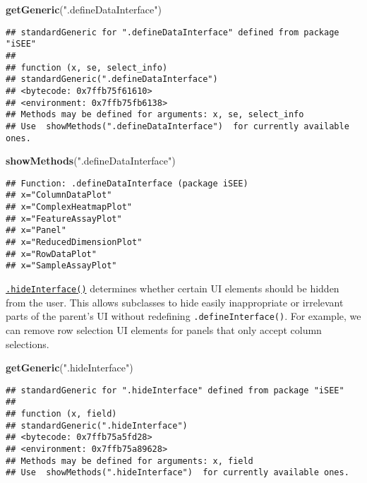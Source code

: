 \documentclass[
]{book}
\newenvironment{Shaded}{\begin{snugshade}}{\end{snugshade}}
\newcommand{\KeywordTok}[1]{\textcolor[rgb]{0.13,0.29,0.53}{\textbf{#1}}}
\newcommand{\NormalTok}[1]{#1}
\newcommand{\StringTok}[1]{\textcolor[rgb]{0.31,0.60,0.02}{#1}}
\begin{document}
\begin{Shaded}
\begin{Highlighting}[]
\KeywordTok{getGeneric}\NormalTok{(}\StringTok{".defineDataInterface"}\NormalTok{)}
\end{Highlighting}
\end{Shaded}

\begin{verbatim}
## standardGeneric for ".defineDataInterface" defined from package "iSEE"
## 
## function (x, se, select_info) 
## standardGeneric(".defineDataInterface")
## <bytecode: 0x7ffb75f61610>
## <environment: 0x7ffb75fb6138>
## Methods may be defined for arguments: x, se, select_info
## Use  showMethods(".defineDataInterface")  for currently available ones.
\end{verbatim}

\begin{Shaded}
\begin{Highlighting}[]
\KeywordTok{showMethods}\NormalTok{(}\StringTok{".defineDataInterface"}\NormalTok{)}
\end{Highlighting}
\end{Shaded}

\begin{verbatim}
## Function: .defineDataInterface (package iSEE)
## x="ColumnDataPlot"
## x="ComplexHeatmapPlot"
## x="FeatureAssayPlot"
## x="Panel"
## x="ReducedDimensionPlot"
## x="RowDataPlot"
## x="SampleAssayPlot"
\end{verbatim}

\href{https://isee.github.io/iSEE/reference/interface-generics.html}{\texttt{.hideInterface()}} determines whether certain UI elements should be hidden from the user.
This allows subclasses to hide easily inappropriate or irrelevant parts of the parent's UI without redefining \texttt{.defineInterface()}.
For example, we can remove row selection UI elements for panels that only accept column selections.

\begin{Shaded}
\begin{Highlighting}[]
\KeywordTok{getGeneric}\NormalTok{(}\StringTok{".hideInterface"}\NormalTok{)}
\end{Highlighting}
\end{Shaded}

\begin{verbatim}
## standardGeneric for ".hideInterface" defined from package "iSEE"
## 
## function (x, field) 
## standardGeneric(".hideInterface")
## <bytecode: 0x7ffb75a5fd28>
## <environment: 0x7ffb75a89628>
## Methods may be defined for arguments: x, field
## Use  showMethods(".hideInterface")  for currently available ones.
\end{verbatim}
\end{document}
